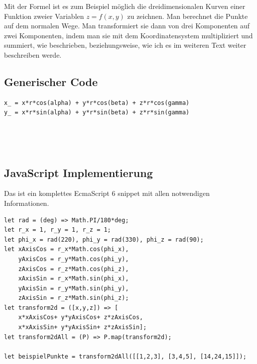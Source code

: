 \documentclass[a4paper]{article}
\begin{document}
Mit der Formel ist es zum Beispiel m\"oglich die dreidimensionalen Kurven einer Funktion zweier Variablen $z=f(x,y)$ zu zeichnen.
Man berechnet die Punkte auf dem normalen Wege. Man transformiert sie dann von drei Komponenten auf zwei Komponenten, indem man sie
mit dem Koordinatensystem multipliziert und summiert, wie beschrieben, beziehungsweise, wie ich es im weiteren Text weiter beschreiben werde.\\


\subsection{Generischer Code}

\begin{example}
\begin{lstlisting}
x_ = x*r*cos(alpha) + y*r*cos(beta) + z*r*cos(gamma)
y_ = x*r*sin(alpha) + y*r*sin(beta) + z*r*sin(gamma)
\end{lstlisting}\\

\end{example}\\

\subsection{JavaScript Implementierung}

\begin{example}
Das ist ein komplettes EcmaScript 6 snippet mit allen notwendigen Informationen.\\
\begin{lstlisting}
let rad = (deg) => Math.PI/180*deg;
let r_x = 1, r_y = 1, r_z = 1; 
let phi_x = rad(220), phi_y = rad(330), phi_z = rad(90); 
let xAxisCos = r_x*Math.cos(phi_x), 
    yAxisCos = r_y*Math.cos(phi_y),
    zAxisCos = r_z*Math.cos(phi_z),
    xAxisSin = r_x*Math.sin(phi_x), 
    yAxisSin = r_y*Math.sin(phi_y),
    zAxisSin = r_z*Math.sin(phi_z);
let transform2d = ([x,y,z]) => [
    x*xAxisCos+ y*yAxisCos+ z*zAxisCos,
    x*xAxisSin+ y*yAxisSin+ z*zAxisSin];
let transform2dAll = (P) => P.map(transform2d);

let beispielPunkte = transform2dAll([[1,2,3], [3,4,5], [14,24,15]]);
\end{lstlisting}
\end{example}\\
\end{document}
